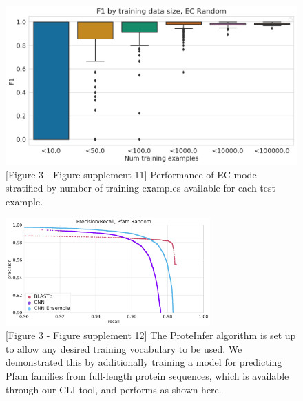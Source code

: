\begin{figure}[htbp]
\centering
  \includegraphics[width=\textwidth]{ec_f1_by_training_size.png}
  \caption{[Figure 3 - Figure supplement 11] Performance of EC model stratified by number of training examples available for each test example.}
  \label{sup:fig:ec_f1_by_training_size}
\end{figure}







\begin{figure}[htbp]
\centering
  \includegraphics[width=0.7\textwidth]{pfam_random.png}
  \caption{[Figure 3 - Figure supplement 12] The ProteInfer algorithm is set up to allow any desired training vocabulary to be used. We demonstrated this by additionally training a model for predicting Pfam families from full-length protein sequences, which is available through our CLI-tool, and performs as shown here.}
  \label{sup:fig:ec_f1_by_training_size}
\end{figure}





%


